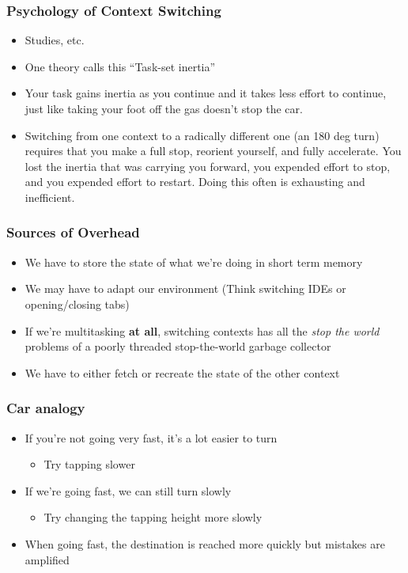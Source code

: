 \documentclass{beamer}
\begin{document}
\begin{frame}
  \frametitle{Psychology of Context Switching}
  \begin{itemize}
    \item Studies, etc.
    \item One theory calls this ``Task-set inertia''
    \item Your task gains inertia as you continue and it takes less effort to continue, just like taking your foot off the gas doesn't stop the car.
    \item Switching from one context to a radically different one (an 180 deg turn) requires that you make a full stop, reorient yourself, and fully accelerate.
      You lost the inertia that was carrying you forward, you expended effort to stop, and you expended effort to restart. Doing this often is exhausting and inefficient.
  \end{itemize}
\end{frame}


\begin{frame}
  \frametitle{Sources of Overhead}
  \begin{itemize}
    \item We have to store the state of what we're doing in short term memory
    \item We may have to adapt our environment (Think switching IDEs or opening/closing tabs)
    \item If we're multitasking \textbf{at all}, switching contexts has all the \textit{stop the world} problems of a poorly threaded stop-the-world garbage collector
    \item We have to either fetch or recreate the state of the other context
  \end{itemize}
\end{frame}


\begin{frame}
  \frametitle{Car analogy}
  \begin{itemize}
    \item If you're not going very fast, it's a lot easier to turn
    \begin{itemize}
      \item Try tapping slower
    \end{itemize}
    \item If we're going fast, we can still turn slowly
    \begin{itemize}
      \item Try changing the tapping height more slowly
    \end{itemize}
    \item When going fast, the destination is reached more quickly but mistakes are amplified
  \end{itemize}
\end{frame}
\end{document}
